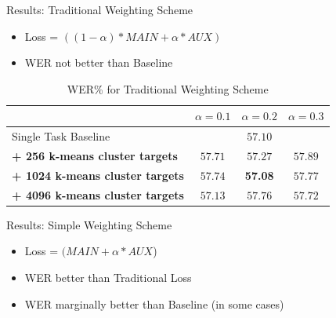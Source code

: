 \documentclass[final]{beamer} %
\begin{document}
\begin{frame}
\begin{columns}
\begin{column}{0.23\textwidth}
{                
        \vfill
        
        \begin{block}{\boxnumber Results: Traditional Weighting Scheme}
          \begin{itemize}
          \item Loss = $((1-\alpha)*MAIN + \alpha*AUX)$
          \item WER not better than Baseline
          \end{itemize}
        \end{block}

        
        \vfill
        

                  
          \begin{table}[!htbp]
            \centering
            \caption{WER\% for Traditional Weighting Scheme}
            \begin{adjustbox}{width=\textwidth}
              \begin{tabular}{lccc}
                \toprule
                & $\alpha = 0.1 $ & $\alpha = 0.2 $ & $\alpha = 0.3 $\\
                \midrule
                Single Task Baseline  &  \multicolumn{3}{c}{$57.10$ \raisebox{.33\height}{\footnotesize{$\pm 3.25$}}}     \\
                \textbf{+ 256 k-means cluster targets}  &  $57.71$ \raisebox{.33\height}{\footnotesize{$\pm 1.59$}}   &  $57.27$ \raisebox{.33\height}{\footnotesize{$\pm 1.60$}}     & $57.89$ \raisebox{.33\height}{\footnotesize{$\pm 1.29$}} \\
                \textbf{+ 1024 k-means cluster targets}   & $57.74$ \raisebox{.33\height}{\footnotesize{$\pm 3.17$}}    & \textbf{57.08} \raisebox{.33\height}{\footnotesize{$\pm 2.62$}}    & $57.77$ \raisebox{.33\height}{\footnotesize{$\pm 0.79$}}  \\
                \textbf{+ 4096 k-means cluster targets}   &  $57.13$ \raisebox{.33\height}{\footnotesize{$\pm 2.45$}}  & $57.76$ \raisebox{.33\height}{\footnotesize{$\pm 1.61$}}   &   $57.72$ \raisebox{.33\height}{\footnotesize{$\pm 0.64$}}  \\
                \bottomrule
              \end{tabular}
            \end{adjustbox}
          \end{table}


          \vfill
          
        
        \begin{block}{\boxnumber Results: Simple Weighting Scheme}
          \begin{itemize}
          \item Loss = $(MAIN + \alpha*AUX$)
          \item WER better than Traditional Loss
          \item WER marginally better than Baseline (in some cases)
          \end{itemize}
        \end{block}        

}
\end{column}
\end{columns}
\end{frame}
\end{document}

